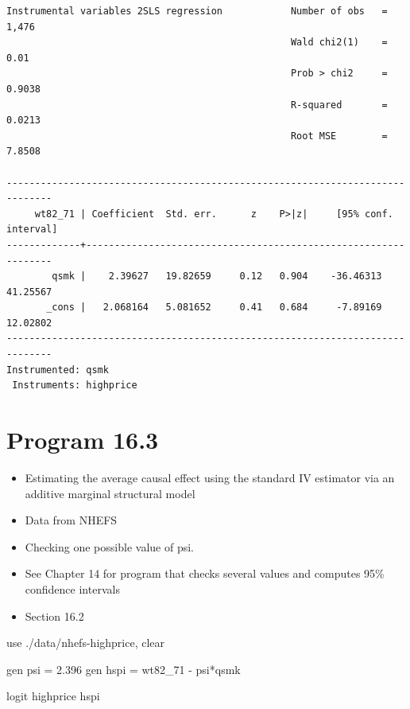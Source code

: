 \documentclass[
  10pt,
  a4paper,
]{book}
\newenvironment{Shaded}{\begin{snugshade}}{\end{snugshade}}
\newcommand{\KeywordTok}[1]{\textcolor[rgb]{0.00,0.46,0.62}{#1}}
\newcommand{\NormalTok}[1]{\textcolor[rgb]{0.00,0.46,0.62}{#1}}
\providecommand{\tightlist}{%
  \setlength{\itemsep}{0pt}\setlength{\parskip}{0pt}}
\begin{document}
\begin{verbatim}
Instrumental variables 2SLS regression            Number of obs   =      1,476
                                                  Wald chi2(1)    =       0.01
                                                  Prob > chi2     =     0.9038
                                                  R-squared       =     0.0213
                                                  Root MSE        =     7.8508

------------------------------------------------------------------------------
     wt82_71 | Coefficient  Std. err.      z    P>|z|     [95% conf. interval]
-------------+----------------------------------------------------------------
        qsmk |    2.39627   19.82659     0.12   0.904    -36.46313    41.25567
       _cons |   2.068164   5.081652     0.41   0.684     -7.89169    12.02802
------------------------------------------------------------------------------
Instrumented: qsmk
 Instruments: highprice
\end{verbatim}

\hypertarget{program-16.3-1}{%
\section{Program 16.3}\label{program-16.3-1}}

\begin{itemize}
\tightlist
\item
  Estimating the average causal effect using the standard IV estimator via an additive marginal structural model
\item
  Data from NHEFS
\item
  Checking one possible value of psi.
\item
  See Chapter 14 for program that checks several values and computes 95\% confidence intervals\\
\item
  Section 16.2
\end{itemize}

\begin{Shaded}
\begin{Highlighting}[]
\KeywordTok{use}\NormalTok{ ./}\KeywordTok{data}\NormalTok{/nhefs{-}highprice, }\KeywordTok{clear}

\KeywordTok{gen}\NormalTok{ psi = 2.396}
\KeywordTok{gen}\NormalTok{ hspi = wt82\_71 {-} psi*qsmk}

\KeywordTok{logit}\NormalTok{ highprice hspi}
\end{Highlighting}
\end{Shaded}
\end{document}

